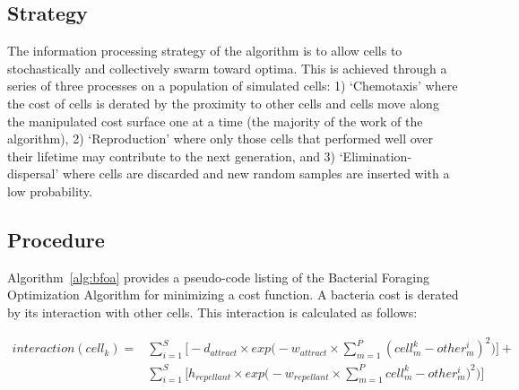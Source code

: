 \subsection{Strategy}
The information processing strategy of the algorithm is to allow cells to stochastically and collectively swarm toward optima.
This is achieved through a series of three processes on a population of simulated cells: 1) `Chemotaxis' where the cost of cells is derated by the proximity to other cells and cells move along the manipulated cost surface one at a time (the majority of the work of the algorithm), 2) `Reproduction' where only those cells that performed well over their lifetime may contribute to the next generation, and 3) `Elimination-dispersal' where cells are discarded and new random samples are inserted with a low probability.

\subsection{Procedure}
Algorithm~\ref{alg:bfoa} provides a pseudo-code listing of the Bacterial Foraging Optimization Algorithm for minimizing a cost function. 
A bacteria cost is derated by its interaction with other cells. This interaction is calculated as follows: 

\begin{align*}
	interaction(cell_k) = 
	&\sum_{i=1}^S\bigg[-d_{attract}\times exp\bigg(-w_{attract}\times \sum_{m=1}^P (cell_m^k - other_m^i)^2 \bigg) \bigg] + \\
	&\sum_{i=1}^S\bigg[h_{repellant}\times exp\bigg(-w_{repellant}\times \sum_{m=1}^P cell_m^k - other_m^i)^2 \bigg) \bigg]
\end{align*}

